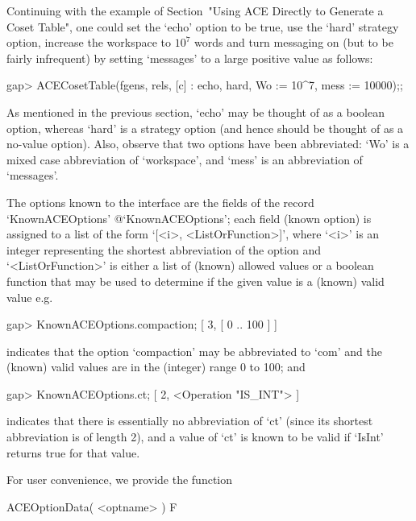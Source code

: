 
Continuing with the example of Section~"Using ACE Directly to Generate
a Coset Table", one could set the `echo' option to be  true,  use  the
`hard' strategy option, increase the workspace  to  $10^7$  words  and
turn messaging on (but to be fairly infrequent) by setting  `messages'
to a large positive value as follows:

\beginexample
gap> ACECosetTable(fgens, rels, [c] : echo, hard, Wo := 10^7, mess := 10000);;
\endexample

As mentioned in the previous section, `echo' may be thought  of  as  a
boolean option, whereas `hard' is a strategy option (and hence  should
be thought of as a no-value option). Also, observe  that  two  options
have  been  abbreviated:  `Wo'  is  a  mixed  case   abbreviation   of
`workspace', and `mess' is an abbreviation of `messages'.


The {\ACE} options known to the {\ACE} interface are the fields of the
record          `KnownACEOptions'{\undoquotes{}
{@`KnownACEOptions'}}; each field (known {\ACE} option) is assigned to
a list of the  form  `[<i>,  <ListOrFunction>]',  where  `<i>'  is  an
integer representing the  shortest  abbreviation  of  the  option  and
`<ListOrFunction>' is either a list of (known)  allowed  values  or  a
boolean function that may be used to determine if the given value is a
(known) valid value e.g.

\beginexample
gap> KnownACEOptions.compaction;
[ 3, [ 0 .. 100 ] ]
\endexample

indicates that the option `compaction' may be  abbreviated  to  `com'
and the (known) valid values are in the (integer) range 0 to 100; and

\beginexample
gap> KnownACEOptions.ct;
[ 2, <Operation "IS_INT"> ]
\endexample

indicates that there is essentially no abbreviation of `ct' (since its
shortest abbreviation is of length 2),  and a value of  `ct' is  known
to be valid if `IsInt' returns true for that value.

\beginitems

For user convenience, we provide the function

\>ACEOptionData( <optname> ) F

